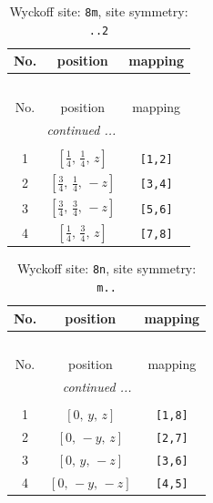 \documentclass[fleqn,8pt]{jsarticle}
\begin{document}
\begin{longtable}{ccc}
\caption{Wyckoff site: {\tt 8m}, site symmetry: {\tt ..2}}
 \\
 \hline \hline
No. & position & mapping \\ \hline \endfirsthead

\multicolumn{2}{l}{\tablename\ \thetable{}} \\
 \hline \hline
No. & position & mapping \\ \hline \endhead

 \hline \hline
\multicolumn{2}{r}{\footnotesize\it continued ...} \\ \endfoot

 \hline \hline
\multicolumn{2}{r}{} \\ \endlastfoot

1 & $\left[ \frac{1}{4},\, \frac{1}{4},\, z \right]$ & {\tt [1,2]} \\ \hline
2 & $\left[ \frac{3}{4},\, \frac{1}{4},\, - z \right]$ & {\tt [3,4]} \\ \hline
3 & $\left[ \frac{3}{4},\, \frac{3}{4},\, - z \right]$ & {\tt [5,6]} \\ \hline
4 & $\left[ \frac{1}{4},\, \frac{3}{4},\, z \right]$ & {\tt [7,8]} \\
\end{longtable}
\renewcommand{\arraystretch}{1.2}
\begin{longtable}{ccc}
\caption{Wyckoff site: {\tt 8n}, site symmetry: {\tt m..}}
 \\
 \hline \hline
No. & position & mapping \\ \hline \endfirsthead

\multicolumn{2}{l}{\tablename\ \thetable{}} \\
 \hline \hline
No. & position & mapping \\ \hline \endhead

 \hline \hline
\multicolumn{2}{r}{\footnotesize\it continued ...} \\ \endfoot

 \hline \hline
\multicolumn{2}{r}{} \\ \endlastfoot

1 & $\left[ 0,\, y,\, z \right]$ & {\tt [1,8]} \\ \hline
2 & $\left[ 0,\, - y,\, z \right]$ & {\tt [2,7]} \\ \hline
3 & $\left[ 0,\, y,\, - z \right]$ & {\tt [3,6]} \\ \hline
4 & $\left[ 0,\, - y,\, - z \right]$ & {\tt [4,5]} \\
\end{longtable}
\end{document}
